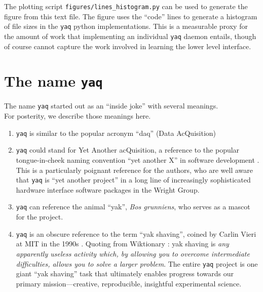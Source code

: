 \documentclass[11pt, full]{article}
\newcommand\yaq{\texttt{yaq}}
\let\stdsection\section
\renewcommand\section{\clearpage\stdsection}
\begin{document}
The plotting script \texttt{figures/lines\_histogram.py} can be used to generate the figure from this text file.
The figure uses the ``code'' lines to generate a histogram of file sizes in the \yaq{} python implementations.
This is a measurable proxy for the amount of work that implementing an individual \yaq{} daemon entails, though of course cannot capture the work involved in learning the lower level interface.

\section{The name \yaq{}}

The name \yaq{} started out as an ``inside joke'' with several meanings. \\
For posterity, we describe those meanings here.
\begin{enumerate}
  \item \yaq{} is similar to the popular acronym ``daq'' (Data AcQuisition)
  \item \yaq{} could stand for Yet Another acQuisition, a reference to the popular tongue-in-cheek naming convention ``yet another X'' in software development \cite{Raymond_1996}. This is a particularly poignant reference for the authors, who are well aware that \yaq{} is ``yet another project'' in a long line of increasingly sophisticated hardware interface software packages in the Wright Group.
  \item \yaq{} can reference the animal ``yak'', \textit{Bos grunniens}, who serves as a mascot for the project.
  \item \yaq{} is an obscure reference to the term ``yak shaving'', coined by Carlin Vieri at MIT in the 1990s \cite{CarlinVieri}. Quoting from Wiktionary \cite{yak_shaving}: yak shaving is \textit{any apparently useless activity which, by allowing you to overcome intermediate difficulties, allows you to solve a larger problem}. The entire \yaq{} project is one giant ``yak shaving'' task that ultimately enables progress towards our primary mission---creative, reproducible, insightful experimental science.
\end{enumerate}

\clearpage

\printbibliography
\end{document}
